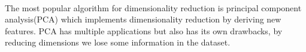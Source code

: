 \paragraph{}
The most popular algorithm for dimensionality reduction is principal component analysis(PCA) which implements dimensionality reduction by deriving new features. PCA has multiple applications but also has its own drawbacks, by reducing dimensions we lose some information in the dataset\cite{Ruan2018}.






